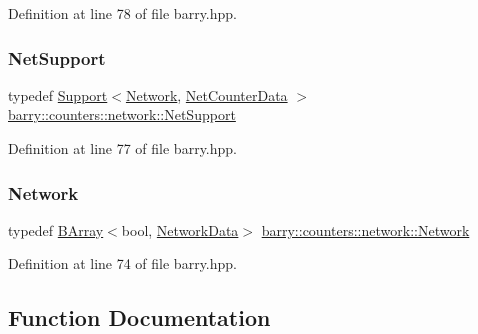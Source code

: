 Definition at line 78 of file barry.\+hpp.

\mbox{\label{namespacebarry_1_1counters_1_1network_a4d30be7f465efd7d218f0264f8386b32}} 
\subsubsection{\texorpdfstring{Net\+Support}{NetSupport}}
{\footnotesize\ttfamily typedef \hyperlink{classbarry_1_1_support}{Support}$<$\hyperlink{namespacebarry_1_1counters_1_1network_a4cb88d4572ded3b447ea269c9cd0b2c0}{Network}, \hyperlink{classbarry_1_1counters_1_1network_1_1_net_counter_data}{Net\+Counter\+Data} $>$ \hyperlink{namespacebarry_1_1counters_1_1network_a4d30be7f465efd7d218f0264f8386b32}{barry\+::counters\+::network\+::\+Net\+Support}}



Definition at line 77 of file barry.\+hpp.

\mbox{\label{namespacebarry_1_1counters_1_1network_a4cb88d4572ded3b447ea269c9cd0b2c0}} 
\subsubsection{\texorpdfstring{Network}{Network}}
{\footnotesize\ttfamily typedef \hyperlink{classbarry_1_1_b_array}{B\+Array}$<$bool, \hyperlink{classbarry_1_1counters_1_1network_1_1_network_data}{Network\+Data}$>$ \hyperlink{namespacebarry_1_1counters_1_1network_a4cb88d4572ded3b447ea269c9cd0b2c0}{barry\+::counters\+::network\+::\+Network}}



Definition at line 74 of file barry.\+hpp.



\subsection{Function Documentation}
\mbox{\label{namespacebarry_1_1counters_1_1network_a0150bbe24de4218a40c0880e55c73e9e}} 

